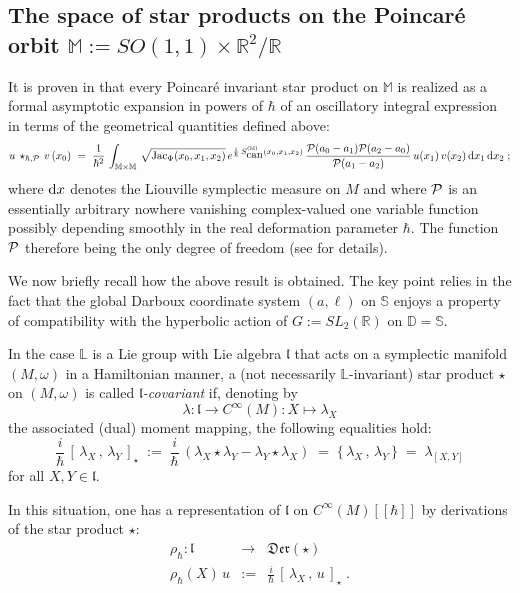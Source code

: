 \documentclass{article}
\newcommand{\LL}{\mathbb L}
\newcommand{\DD}{\mathbb D}
\renewcommand{\SS}{\mathbb S}
\newcommand{\R}{\mathbb R}
\newcommand{\MM}{\mathbb M}
\def \R{{\mathbb R}}
\begin{document}
\subsection{The space of star products on the Poincar\'e orbit $\MM:=SO(1,1)\times\R^2/\R$} It is proven in \cite{Bi07} that every Poincar\'e invariant star product on $\MM$ is realized as
a formal  asymptotic expansion in powers of $\hbar$ of an oscillatory integral expression in terms of the geometrical quantities defined above:
\begin{equation*}
u\,\star_{\hbar,{\cal P}} \,v\,(x_0)\;=\;\frac{1}{\hbar^2}\,\int_{\MM\times \MM}\,\sqrt{\mbox{\rm Jac}_{\Phi}(x_0,x_1,x_2)}\,e^{\frac{i}{\hbar}\,S^{(\MM)}_{\mbox{\rm can}}(x_0,x_1,x_2)}\,\frac{{\cal P}(a_0-a_1){\cal  P}(a_2-a_0)}{{\cal  P}(a_1-a_2)}\,u(x_1)\,v(x_2)\,{\rm d}x_1\,{\rm d}x_2\;;
\end{equation*}
where ${\rm d}x$ denotes the Liouville symplectic measure on $M$ and where $\cal P$ is an essentially arbitrary nowhere vanishing complex-valued one variable function possibly depending smoothly in the real deformation
parameter $\hbar$. The function $\cal P$
therefore being the only degree of freedom (see \cite{Bi07} for details).

\noindent We now briefly recall how the above result is obtained. The key point relies in the fact that the global Darboux coordinate system $(a,\ell)$ on $\SS$ enjoys a property of compatibility with 
the hyperbolic action of $G:=SL_2(\R)$ on $\DD=\SS$. 

\noindent In the case $\LL$ is a Lie group with Lie algebra $\mathfrak{l}$ that acts on a symplectic manifold $(M,\omega)$ in a Hamiltonian manner, a 
(not necessarily $\LL$-invariant) star product $\star$ on $(M,\omega)$  is called {\sl $\mathfrak{l}$-covariant}
if, denoting by
\begin{equation}
\lambda:\mathfrak{l}\longrightarrow C^\infty(M): X\mapsto \lambda_X
\end{equation}
the associated (dual) moment mapping, the following equalities hold:
\begin{equation}
\frac{i}{\hbar}\,[\,\lambda_X\,,\,\lambda_Y\,]_\star\;:=\;\frac{i}{\hbar}\,(\lambda_X\star\lambda_Y-\lambda_Y\star\lambda_X)\;=\;\{\,\lambda_X\,,\,\lambda_Y\,\}\;=\;\lambda_{[X,Y]}
\end{equation}
for all $X,Y\in\mathfrak{l}$. 

\noindent In this situation, one has a representation of $\mathfrak{l}$ on $C^\infty(M)[[\hbar]]$
by derivations of the star product $\star$:
\begin{eqnarray}
\rho_\hbar:\mathfrak{l}&\longrightarrow&\mathfrak{Der}(\star)\\
\rho_\hbar(X)\,u&:=&\frac{i}{\hbar}\,[\,\lambda_X\,,\,u\,]_\star\;.
\end{eqnarray}
\end{document}
